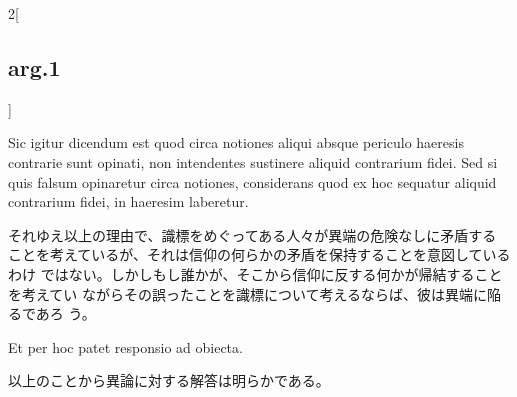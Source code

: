 \documentclass[paper=a4paper,fontsize=10pt,jafontsize=9pt,titlepage]{jlreq}
\begin{document}
\begin{paracol}{2}[\subsection{arg.1}]
\switchcolumn*

Sic
igitur dicendum est quod circa notiones aliqui absque periculo
haeresis contrarie sunt opinati, non intendentes sustinere aliquid
contrarium fidei. Sed si quis falsum opinaretur circa notiones,
considerans quod ex hoc sequatur aliquid contrarium fidei, in haeresim
laberetur.

\switchcolumn

それゆえ以上の理由で、識標をめぐってある人々が異端の危険なしに矛盾する
ことを考えているが、それは信仰の何らかの矛盾を保持することを意図しているわけ
 ではない。しかしもし誰かが、そこから信仰に反する何かが帰結することを考えてい
 ながらその誤ったことを識標について考えるならば、彼は異端に陥るであろ
 う。

\switchcolumn*

Et per hoc patet responsio ad obiecta.

\switchcolumn

以上のことから異論に対する解答は明らかである。

\end{paracol}
\end{document}

